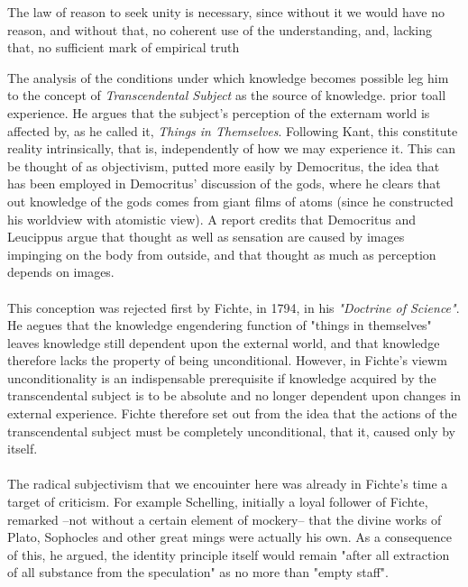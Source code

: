 \documentclass[9pt,a4paper,twocolumn]{article}
\begin{document}
                \begin{qt}
                    The law of reason to seek unity is necessary, since without it we would have no reason, and without that, no coherent use of the understanding, and, lacking that, no sufficient mark of empirical truth
                \end{qt}
                The analysis of the conditions under which knowledge becomes possible leg him to the concept of \textit{Transcendental Subject} as the source of knowledge. prior toall experience. He argues that the subject's perception of the externam world is affected by, as he called it, \textit{Things in Themselves}. Following Kant, this constitute reality intrinsically, that is, independently of how we may experience it. This can be thought of as objectivism, putted more easily by Democritus, the idea that has been employed in Democritus' discussion of the gods, where he clears that out knowledge of the gods comes from giant films of atoms (since he constructed his worldview with atomistic view). A report credits that Democritus and Leucippus argue that thought as well as sensation are caused by images impinging on the body from outside, and that thought as much as perception depends on images.\cite{Cartledge1998-CARDTG-3}\cite{sep-democritus}\cite{Graham2010-th}
                \\
                \\
                This conception was rejected first by Fichte, in 1794, in his \textit{"Doctrine of Science"}. He aegues that the knowledge engendering function of "things in themselves" leaves knowledge still dependent upon the external world, and that knowledge therefore lacks the property of being unconditional. However, in Fichte's viewm unconditionality is an indispensable prerequisite if knowledge acquired by the transcendental subject is to be absolute and no longer dependent upon changes in external experience. Fichte therefore set out from the idea that the actions of the transcendental subject must be completely unconditional, that it, caused only by itself.
                \\
                \\
                The radical subjectivism that we encouinter here was already in Fichte's time a target of criticism. For example Schelling, initially a loyal follower of Fichte, remarked --not without a certain element of mockery-- that the divine works of Plato, Sophocles and other great mings were actually his own. As a consequence of this, he argued, the identity principle itself would remain "after all extraction of all substance from the speculation" as no more than "empty staff".
\end{document}

